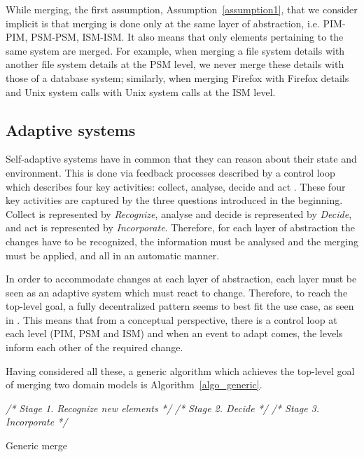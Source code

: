\documentclass{sig-alternate}
\begin{document}
While merging, the first assumption, Assumption~\ref{assumption1}, that we consider implicit is that merging is done only at the same layer of abstraction, i.e. PIM-PIM, PSM-PSM, ISM-ISM. 
It also means that only elements pertaining to the same system are merged. 
For example, when merging a file system details with another file system details at the PSM level, we never merge these details with those of a database system;
similarly, when merging Firefox with Firefox details and Unix system calls with Unix system calls at the ISM level. 

\subsection{Adaptive systems}
Self-adaptive systems have in common that they can reason about their state and environment. 
This is done via feedback processes described by a control loop which describes four key activities: collect, analyse, decide and act \cite{adaptive1}.
These four key activities are captured by the three questions introduced in the beginning.
Collect is represented by \textit{Recognize}, 
analyse and decide is represented by \textit{Decide},
and act is represented by \textit{Incorporate}.
Therefore, for each layer of abstraction the changes have to be recognized, the information must be analysed and the merging must be applied, and all in an automatic manner.

In order to accommodate changes at each layer of abstraction, each layer must be seen as an adaptive system which must react to change.
Therefore, to reach the top-level goal, a fully decentralized pattern seems to best fit the use case, as seen in \cite{adaptive2}. 
This means that from a conceptual perspective, there is a control loop at each level (PIM, PSM and ISM)
and when an event to adapt comes, the levels inform each other of the required change.

Having considered all these, a generic algorithm which achieves the top-level goal of merging two domain models is Algorithm~\ref{algo_generic}.

\IncMargin{1em}
\begin{algorithm}
  \BlankLine
  	\emph{/* Stage 1. Recognize new elements */}\;
  	\emph{/* Stage 2. Decide */}\;
	\emph{/* Stage 3. Incorporate */}\;  
  \caption{Generic merge}\label{algo_generic}
\end{algorithm}
\DecMargin{1em}
\end{document}
